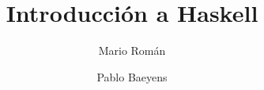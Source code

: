 \documentclass[paper=a4, fontsize=11pt, spanish]{tufte-handout}
\title{Introducción a Haskell}
\author{Mario Román \and Pablo Baeyens} %
\date{}
\newcommand{\seccion}[1]{} %
\begin{document}
\maketitle

\seccion{ghc}
\seccion{tipos}
\seccion{constr}
\seccion{funciones}
\seccion{defTipos}
\newpage
\seccion{apendice}
\end{document}
